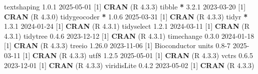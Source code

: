 \documentclass[
]{article}
\newenvironment{Shaded}{\begin{snugshade}}{\end{snugshade}}
\newcommand{\DecValTok}[1]{\textcolor[rgb]{0.00,0.00,0.81}{#1}}
\newcommand{\FloatTok}[1]{\textcolor[rgb]{0.00,0.00,0.81}{#1}}
\newcommand{\FunctionTok}[1]{\textcolor[rgb]{0.13,0.29,0.53}{\textbf{#1}}}
\newcommand{\NormalTok}[1]{#1}
\newcommand{\SpecialCharTok}[1]{\textcolor[rgb]{0.81,0.36,0.00}{\textbf{#1}}}
\begin{document}
\begin{Shaded}
\begin{Highlighting}[]
\NormalTok{ textshaping     }\DecValTok{1}\NormalTok{.}\FloatTok{0.1}   \DecValTok{2025{-}05{-}01}\NormalTok{ [}\DecValTok{1}\NormalTok{] }\FunctionTok{CRAN}\NormalTok{ (R }\DecValTok{4}\NormalTok{.}\FloatTok{3.3}\NormalTok{)}
\NormalTok{ tibble        }\SpecialCharTok{*} \DecValTok{3}\NormalTok{.}\FloatTok{2.1}   \DecValTok{2023{-}03{-}20}\NormalTok{ [}\DecValTok{1}\NormalTok{] }\FunctionTok{CRAN}\NormalTok{ (R }\DecValTok{4}\NormalTok{.}\FloatTok{3.0}\NormalTok{)}
\NormalTok{ tidygeocoder  }\SpecialCharTok{*} \DecValTok{1}\NormalTok{.}\FloatTok{0.6}   \DecValTok{2025{-}03{-}31}\NormalTok{ [}\DecValTok{1}\NormalTok{] }\FunctionTok{CRAN}\NormalTok{ (R }\DecValTok{4}\NormalTok{.}\FloatTok{3.3}\NormalTok{)}
\NormalTok{ tidyr         }\SpecialCharTok{*} \DecValTok{1}\NormalTok{.}\FloatTok{3.1}   \DecValTok{2024{-}01{-}24}\NormalTok{ [}\DecValTok{1}\NormalTok{] }\FunctionTok{CRAN}\NormalTok{ (R }\DecValTok{4}\NormalTok{.}\FloatTok{3.1}\NormalTok{)}
\NormalTok{ tidyselect      }\DecValTok{1}\NormalTok{.}\FloatTok{2.1}   \DecValTok{2024{-}03{-}11}\NormalTok{ [}\DecValTok{1}\NormalTok{] }\FunctionTok{CRAN}\NormalTok{ (R }\DecValTok{4}\NormalTok{.}\FloatTok{3.1}\NormalTok{)}
\NormalTok{ tidytree        }\DecValTok{0}\NormalTok{.}\FloatTok{4.6}   \DecValTok{2023{-}12{-}12}\NormalTok{ [}\DecValTok{1}\NormalTok{] }\FunctionTok{CRAN}\NormalTok{ (R }\DecValTok{4}\NormalTok{.}\FloatTok{3.1}\NormalTok{)}
\NormalTok{ timechange      }\DecValTok{0}\NormalTok{.}\FloatTok{3.0}   \DecValTok{2024{-}01{-}18}\NormalTok{ [}\DecValTok{1}\NormalTok{] }\FunctionTok{CRAN}\NormalTok{ (R }\DecValTok{4}\NormalTok{.}\FloatTok{3.3}\NormalTok{)}
\NormalTok{ treeio          }\DecValTok{1}\NormalTok{.}\FloatTok{26.0}  \DecValTok{2023{-}11{-}06}\NormalTok{ [}\DecValTok{1}\NormalTok{] Bioconductor}
\NormalTok{ units           }\FloatTok{0.8}\DecValTok{{-}7}   \DecValTok{2025{-}03{-}11}\NormalTok{ [}\DecValTok{1}\NormalTok{] }\FunctionTok{CRAN}\NormalTok{ (R }\DecValTok{4}\NormalTok{.}\FloatTok{3.3}\NormalTok{)}
\NormalTok{ utf8            }\DecValTok{1}\NormalTok{.}\FloatTok{2.5}   \DecValTok{2025{-}05{-}01}\NormalTok{ [}\DecValTok{1}\NormalTok{] }\FunctionTok{CRAN}\NormalTok{ (R }\DecValTok{4}\NormalTok{.}\FloatTok{3.3}\NormalTok{)}
\NormalTok{ vctrs           }\DecValTok{0}\NormalTok{.}\FloatTok{6.5}   \DecValTok{2023{-}12{-}01}\NormalTok{ [}\DecValTok{1}\NormalTok{] }\FunctionTok{CRAN}\NormalTok{ (R }\DecValTok{4}\NormalTok{.}\FloatTok{3.3}\NormalTok{)}
\NormalTok{ viridisLite     }\DecValTok{0}\NormalTok{.}\FloatTok{4.2}   \DecValTok{2023{-}05{-}02}\NormalTok{ [}\DecValTok{1}\NormalTok{] }\FunctionTok{CRAN}\NormalTok{ (R }\DecValTok{4}\NormalTok{.}\FloatTok{3.3}\NormalTok{)}

\end{Highlighting}
\end{Shaded}
\end{document}
